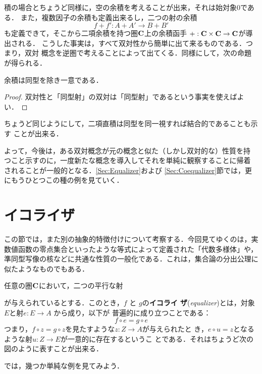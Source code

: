 \begin{example}
 積の場合とちょうど同様に，空の余積を考えることが出来，それは始対象$0$である．
 また，複数因子の余積も定義出来るし，二つの射の余積
 \[
  f+f': A + A' \to B + B'
 \]
 も定義できて，そこから二項余積を持つ圏${\bf C}$上の余積函手
 $+: {\bf C} \times {\bf C} \to {\bf C}$が導出される．
 こうした事実は，すべて双対性から簡単に出て来るものである．つまり，双対
 概念を逆圏で考えることによって出てくる．同様にして，次の命題が得られる．
 \begin{prop}
  余積は同型を除き一意である．
 \end{prop}
 \begin{proof}
  双対性と「同型射」の双対は「同型射」であるという事実を使えばよい．
 \end{proof}
 ちょうど同じようにして，二項直積は同型を同一視すれば結合的であることも示す
 ことが出来る．

 よって，今後は，ある双対概念が元の概念と似た（しかし双対的な）性質を持
 つこと示すのに，一度新たな概念を導入してそれを単純に観察することに帰着
 されることが一般的となる．\ref{Sec:Equalizer}および
 \ref{Sec:Coequalizer}節では，更にもうひとつこの種の例を見ていく．
\end{example}
\section{イコライザ}

この節では，また別の抽象的特徴付けについて考察する．今回見てゆくのは，実
数値函数の零点集合といったような等式によって定義された「代数多様体」や，
準同型写像の核などに共通な性質の一般化である．これは，集合論の分出公理に
似たようなものでもある．

\begin{definition}
 任意の圏${\bf C}$において，二つの平行な射
 \begin{center}
 \end{center}
 が与えられているとする．このとき，$f$ と $g$の{\bfseries イコライ
 ザ}({\itshape equalizer})とは，対象$E$と射$e:E \to A$ から成り，以下が
 普遍的に成り立つことである：
 \[
  f \circ e = g \circ e
 \]
 つまり，$f \circ z = g \circ z$を見たすような$z: Z \to A$が与えられたと
 き，$e \circ u = z$となるような射$u: Z \to E$が一意的に存在するというこ
 とである．それはちょうど次の図のように表すことが出来る．
 \begin{center}
 \end{center}
\end{definition}
では，幾つか単純な例を見てみよう．

